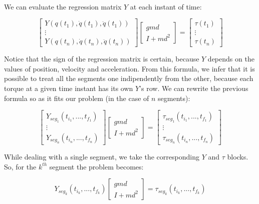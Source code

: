 \documentclass{article}
\begin{document}
\paragraph{}We can evaluate the regression matrix $Y$ at each instant of time:

\vspace{1em}
\[\begin{bmatrix}
Y(q(t_1),\dot{q}(t_1),\ddot{q}(t_1))\\
\vdots \\
Y(q(t_n),\dot{q}(t_n),\ddot{q}(t_n))
\end{bmatrix} \begin{bmatrix}
gmd \\ I +md^2
\end{bmatrix} = \begin{bmatrix}
\tau(t_1)\\
\vdots \\
\tau(t_n)
\end{bmatrix} \]
\vspace{1em}

Notice that the sign of the regression matrix is certain, because $Y$ depends on the values of position, velocity and acceleration. From this formula, we infer that it is possible to treat all the segments one indipendently from the other, because each torque at a given time instant has its own $Y$'s row. We can rewrite the previous formula so as it fits our problem (in the case of $n$ segments):

\vspace{1em}
\[\begin{bmatrix}
Y_{seg_1}(t_{i_1}, ..., t_{f_1})\\
\vdots \\
Y_{seg_n}(t_{i_n}, ..., t_{f_n})
\end{bmatrix} \begin{bmatrix}
gmd \\ I +md^2
\end{bmatrix} = \begin{bmatrix}
\tau_{seg_1}(t_{i_1}, ..., t_{f_1})\\
\vdots \\
\tau_{seg_n}(t_{i_n}, ..., t_{f_n})
\end{bmatrix} \]
\vspace{1em}

While dealing with a single segment, we take the corresponding $Y$ and $\tau$  blocks. So, for the $k^{th}$ segment the problem becomes:

\[Y_{seg_k}(t_{i_k}, ..., t_{f_k})
\begin{bmatrix}
gmd \\ I +md^2
\end{bmatrix} =
\tau_{seg_k}(t_{i_k}, ..., t_{f_k})\]
\end{document}
